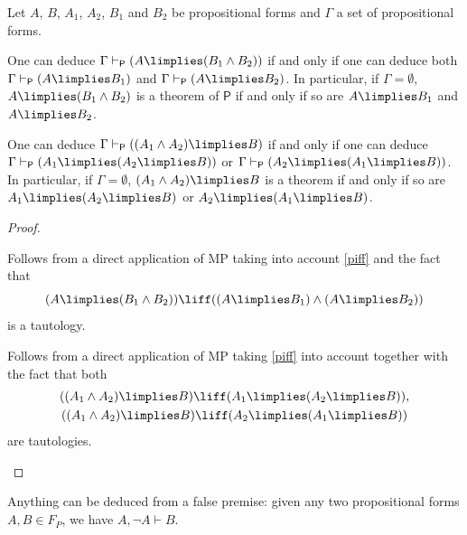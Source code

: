 \begin{proposition}
\label{impsystemp}
Let $A$, $B$, $A_1$, $A_2$, $B_1$ and $B_2$ be propositional forms and $\Gamma$ a set of propositional forms.
\begin{statements}
\item One can deduce $\Gamma \vdash_\mathsf{P} (A \limplies (B_1\land B_2))$ if and only if one can deduce both $\Gamma \vdash_\mathsf{P} (A\limplies B_1)$ and $\Gamma \vdash_\mathsf{P} (A\limplies B_2)$. In particular, if $\Gamma = \emptyset$, $A\limplies (B_1\land B_2)$ is a theorem of $\mathsf{P}$ if and only if so are $A\limplies B_1$ and $A \limplies B_2$.

\item One can deduce $\Gamma \vdash_\mathsf{P} ( (A_1\land A_2) \limplies B )$ if and only if one can deduce $\Gamma \vdash_\mathsf{P} (A_1 \limplies (A_2 \limplies B))$ or $\Gamma \vdash_\mathsf{P} (A_2 \limplies (A_1 \limplies B))$. In particular, if $\Gamma = \emptyset$, $(A_1\land A_2) \limplies B$ is a theorem if and only if so are $A_1\limplies (A_2\limplies B)$ or $A_2 \limplies (A_1 \limplies B)$.
\end{statements}
\label{implesmani}
\end{proposition}

\begin{proof}
\begin{parlist}
\item Follows from a direct application of MP taking into account \ref{piff} and the fact that \[(A\limplies (B_1\land B_2)) \liff ((A\limplies B_1) \land (A\limplies B_2))\] is a tautology.
\item Follows from a direct application of MP taking \ref{piff} into account together with the fact that both
\begin{gather*}
((A_1 \land A_2)\limplies B) \liff (A_1 \limplies (A_2 \limplies B)),\\
((A_1 \land A_2)\limplies B) \liff (A_2 \limplies (A_1 \limplies B))
\end{gather*}
are tautologies.
\end{parlist}
\end{proof}

\begin{proposition}
\label{pexpprop}
Anything can be deduced from a false premise: given any two propositional forms $A,B\in F_P$, we have $A,\lnot A \vdash B$. 
\end{proposition}

